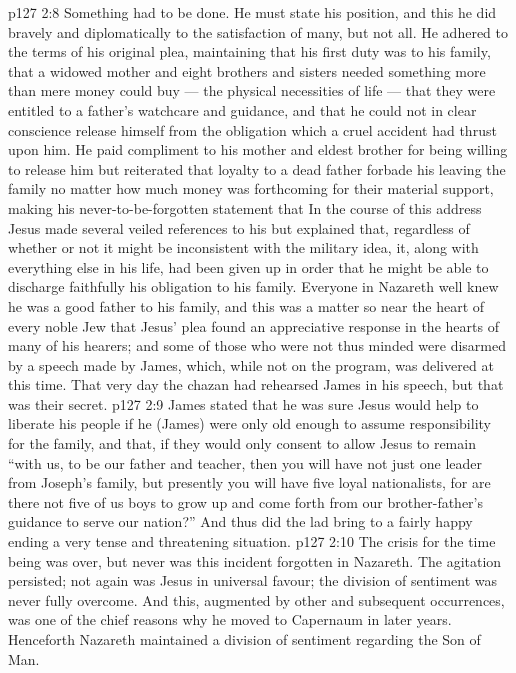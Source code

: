 \vs p127 2:8 Something had to be done. He must state his position, and this he did bravely and diplomatically to the satisfaction of many, but not all. He adhered to the terms of his original plea, maintaining that his first duty was to his family, that a widowed mother and eight brothers and sisters needed something more than mere money could buy --- the physical necessities of life --- that they were entitled to a father’s watchcare and guidance, and that he could not in clear conscience release himself from the obligation which a cruel accident had thrust upon him. He paid compliment to his mother and eldest brother for being willing to release him but reiterated that loyalty to a dead father forbade his leaving the family no matter how much money was forthcoming for their material support, making his never\hyp{}to\hyp{}be\hyp{}forgotten statement that  In the course of this address Jesus made several veiled references to his  but explained that, regardless of whether or not it might be inconsistent with the military idea, it, along with everything else in his life, had been given up in order that he might be able to discharge faithfully his obligation to his family. Everyone in Nazareth well knew he was a good father to his family, and this was a matter so near the heart of every noble Jew that Jesus’ plea found an appreciative response in the hearts of many of his hearers; and some of those who were not thus minded were disarmed by a speech made by James, which, while not on the program, was delivered at this time. That very day the chazan had rehearsed James in his speech, but that was their secret.
\vs p127 2:9 James stated that he was sure Jesus would help to liberate his people if he (James) were only old enough to assume responsibility for the family, and that, if they would only consent to allow Jesus to remain “with us, to be our father and teacher, then you will have not just one leader from Joseph’s family, but presently you will have five loyal nationalists, for are there not five of us boys to grow up and come forth from our brother\hyp{}father’s guidance to serve our nation?” And thus did the lad bring to a fairly happy ending a very tense and threatening situation.
\vs p127 2:10 The crisis for the time being was over, but never was this incident forgotten in Nazareth. The agitation persisted; not again was Jesus in universal favour; the division of sentiment was never fully overcome. And this, augmented by other and subsequent occurrences, was one of the chief reasons why he moved to Capernaum in later years. Henceforth Nazareth maintained a division of sentiment regarding the Son of Man.
